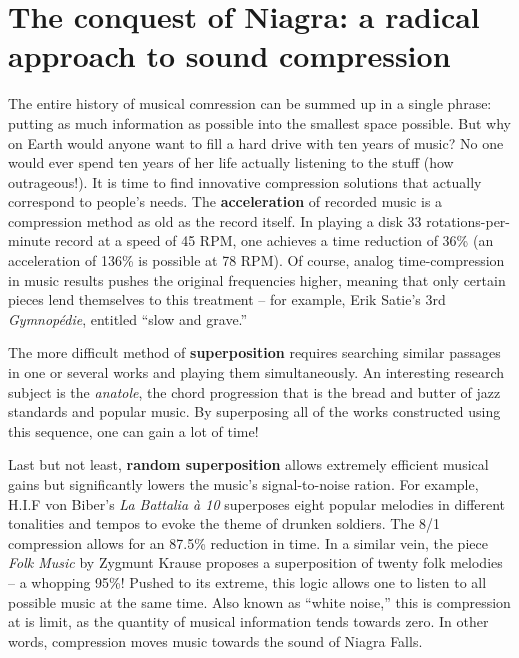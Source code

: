\documentclass{article}
\begin{document}
\section*{The conquest of Niagra: a radical approach to sound compression}
The entire history of musical comression can be summed up in a single
phrase: putting as much information as possible into the smallest space
possible.  But why on Earth would anyone want to fill a hard drive with ten
years of music?  No one would ever spend ten years of her life actually
listening to the stuff (how outrageous!).  It is time to find innovative
compression solutions that actually correspond to people's needs.
The \textbf{acceleration} of recorded music is a compression method as old
as the record itself.  In playing a disk 33 rotations-per-minute record
at a speed of 45 RPM, one achieves a time reduction of 36\% (an acceleration
of 136\% is possible at 78 RPM).  Of course, analog time-compression in
music results pushes the original frequencies higher, meaning that only
certain pieces lend themselves to this treatment -- for example, Erik
Satie's 3rd \emph{Gymnop\'edie}, entitled ``slow and grave.''

The more difficult method of \textbf{superposition} requires searching
similar passages in one or several works and playing them simultaneously. 
An interesting research subject is the \emph{anatole}, the chord progression
that is the bread and butter of jazz standards and popular music.  By
superposing all of the works constructed using this sequence, one can gain a
lot of time!

Last but not least, \textbf{random superposition} allows extremely efficient
musical gains but significantly lowers the music's signal-to-noise ration.
For example, H.I.F von Biber's \emph{La Battalia à 10} superposes eight
popular melodies in different tonalities and tempos to evoke the theme of
drunken soldiers.  The 8/1 compression allows for an 87.5\% reduction in
time.  In a similar vein, the piece \emph{Folk Music} by Zygmunt Krause
proposes a superposition of twenty folk melodies -- a whopping 95\%! Pushed
to its extreme, this logic allows one to listen to all possible music at the
same time.  Also known as ``white noise,'' this is compression at is limit,
as the quantity of musical information tends towards zero.  In other words,
compression moves music towards the sound of Niagra Falls.
\end{document}
